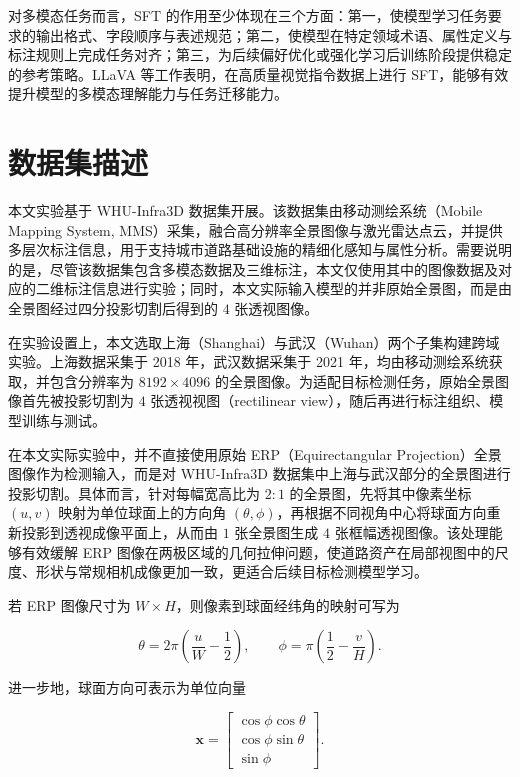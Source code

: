 对多模态任务而言，SFT 的作用至少体现在三个方面：第一，使模型学习任务要求的输出格式、字段顺序与表述规范；第二，使模型在特定领域术语、属性定义与标注规则上完成任务对齐；第三，为后续偏好优化或强化学习后训练阶段提供稳定的参考策略。LLaVA 等工作表明，在高质量视觉指令数据上进行 SFT，能够有效提升模型的多模态理解能力与任务迁移能力\cite{liu2023visualinstruction}。

\section{数据集描述}

本文实验基于 WHU-Infra3D 数据集开展。该数据集由移动测绘系统（Mobile Mapping System, MMS）采集，融合高分辨率全景图像与激光雷达点云，并提供多层次标注信息，用于支持城市道路基础设施的精细化感知与属性分析\cite{whu_infra3d_2025}。需要说明的是，尽管该数据集包含多模态数据及三维标注，本文仅使用其中的图像数据及对应的二维标注信息进行实验；同时，本文实际输入模型的并非原始全景图，而是由全景图经过四分投影切割后得到的 $4$ 张透视图像。

在实验设置上，本文选取上海（Shanghai）与武汉（Wuhan）两个子集构建跨域实验。上海数据采集于 2018 年，武汉数据采集于 2021 年，均由移动测绘系统获取，并包含分辨率为 $8192 \times 4096$ 的全景图像。为适配目标检测任务，原始全景图像首先被投影切割为 $4$ 张透视视图（rectilinear view），随后再进行标注组织、模型训练与测试。

在本文实际实验中，并不直接使用原始 ERP（Equirectangular Projection）全景图像作为检测输入，而是对 WHU-Infra3D 数据集中上海与武汉部分的全景图进行投影切割。具体而言，针对每幅宽高比为 $2{:}1$ 的全景图，先将其中像素坐标 $(u,v)$ 映射为单位球面上的方向角 $(\theta,\phi)$，再根据不同视角中心将球面方向重新投影到透视成像平面上，从而由 $1$ 张全景图生成 $4$ 张框幅透视图像。该处理能够有效缓解 ERP 图像在两极区域的几何拉伸问题，使道路资产在局部视图中的尺度、形状与常规相机成像更加一致，更适合后续目标检测模型学习。

若 ERP 图像尺寸为 $W \times H$，则像素到球面经纬角的映射可写为

\begin{equation}
\theta = 2\pi\left(\frac{u}{W}-\frac{1}{2}\right), \qquad
\phi = \pi\left(\frac{1}{2}-\frac{v}{H}\right).
\end{equation}

进一步地，球面方向可表示为单位向量

\begin{equation}
\mathbf{x}=
\begin{bmatrix}
\cos\phi\cos\theta\\
\cos\phi\sin\theta\\
\sin\phi
\end{bmatrix}.
\end{equation}

